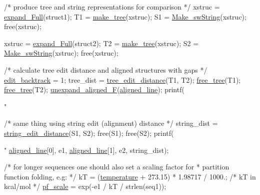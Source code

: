 \begin{DoxyCodeInclude}
  \textcolor{comment}{/* produce tree and string representations for comparison */}
  xstruc  = \hyperlink{group__struct__utils_ga78d73cd54a068ef2812812771cdddc6f}{expand\_Full}(struct1);
  T1      = \hyperlink{treedist_8h_a08fe4d5afd385dce593b86eaf010c6e3}{make\_tree}(xstruc);
  S1      = \hyperlink{stringdist_8h_a3125991b3a403b3f89230474deb3f22e}{Make\_swString}(xstruc);
  free(xstruc);

  xstruc  = \hyperlink{group__struct__utils_ga78d73cd54a068ef2812812771cdddc6f}{expand\_Full}(struct2);
  T2      = \hyperlink{treedist_8h_a08fe4d5afd385dce593b86eaf010c6e3}{make\_tree}(xstruc);
  S2      = \hyperlink{stringdist_8h_a3125991b3a403b3f89230474deb3f22e}{Make\_swString}(xstruc);
  free(xstruc);

  \textcolor{comment}{/* calculate tree edit distance and aligned structures with gaps */}
  \hyperlink{dist__vars_8h_aa03194c513af6b860e7b33e370b82bdb}{edit\_backtrack}  = 1;
  tree\_dist       = \hyperlink{treedist_8h_a3b21f1925f7071f46d93431a835217bb}{tree\_edit\_distance}(T1, T2);
  \hyperlink{treedist_8h_acbc1cb9bce582ea945e4a467c76a57aa}{free\_tree}(T1);
  \hyperlink{treedist_8h_acbc1cb9bce582ea945e4a467c76a57aa}{free\_tree}(T2);
  \hyperlink{group__struct__utils_ga1054c4477d53b31d79d4cb132100e87a}{unexpand\_aligned\_F}(\hyperlink{dist__vars_8h_ac1605fe3448ad0a0b809c4fb8f6a854a}{aligned\_line});
  printf(\textcolor{stringliteral}{"%

  \textcolor{comment}{/* same thing using string edit (alignment) distance */}
  string\_dist = \hyperlink{stringdist_8h_a89e3c335ef17780576d7c0e713830db9}{string\_edit\_distance}(S1, S2);
  free(S1);
  free(S2);
  printf(\textcolor{stringliteral}{"%
         \hyperlink{dist__vars_8h_ac1605fe3448ad0a0b809c4fb8f6a854a}{aligned\_line}[0], e1, \hyperlink{dist__vars_8h_ac1605fe3448ad0a0b809c4fb8f6a854a}{aligned\_line}[1], e2, string\_dist);

  \textcolor{comment}{/* for longer sequences one should also set a scaling factor for}
\textcolor{comment}{   * partition function folding, e.g: */}
  kT        = (\hyperlink{group__model__details_gab4b11c8d9c758430960896bc3fe82ead}{temperature} + 273.15) * 1.98717 / 1000.; \textcolor{comment}{/* kT in kcal/mol */}
  \hyperlink{group__model__details_gad3b22044065acc6dee0af68931b52cfd}{pf\_scale}  = exp(-e1 / kT / strlen(seq1));

}}
\end{DoxyCodeInclude}
